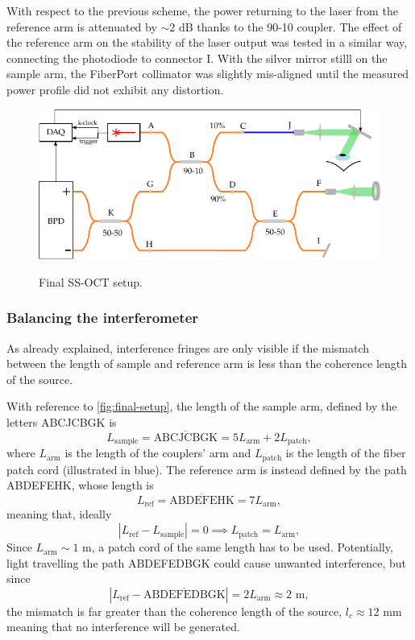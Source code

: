 With respect to the previous scheme, the power returning to the laser from the reference arm is attenuated by $\sim 2$ dB thanks to the 90-10 coupler. 
The effect of the reference arm on the stability of the laser output was tested in a similar way, connecting the photodiode to connector I. With the silver mirror stilll on the sample arm, the FiberPort collimator was slightly mis-aligned until the measured power profile did not exhibit any distortion. 

\begin{figure}[bth]
	\myfloatalign
	{\includegraphics[width=\linewidth]{gfx/setup-diagrams/final-setup-2.pdf}}
	\caption{Final SS-OCT setup.}\label{fig:final-setup}
\end{figure}

\subsubsection{Balancing the interferometer}
As already explained, interference fringes are only visible if the mismatch between the length of sample and reference arm is less than the coherence length of the source.

With reference to \autoref{fig:final-setup}, the length of the sample arm, defined by the letters ABCJCBGK is
\begin{equation}
L_{\text{sample}} = \overline{\text{ABCJCBGK}} = 5L_{\text{arm}} + 2L_{\text{patch}},
\end{equation}
where $L_{\text{arm}}$ is the length of the couplers' arm and $L_{\text{patch}}$ is the length of the fiber patch cord (illustrated in blue). The reference arm is instead defined by the path ABDEFEHK, whose length is
\begin{equation}
	L_{\text{ref}} = \overline{\text{ABDEFEHK}} = 7L_{\text{arm}},
\end{equation}
meaning that, ideally
\begin{equation}
	| L_{\text{ref}} - L_{\text{sample}}| = 0 \implies L_{\text{patch}} = L_{\text{arm}},
\end{equation}
Since $L_{\text{arm}} \sim 1$ m, a patch cord of the same length has to be used. Potentially, light travelling the path ABDEFEDBGK could cause unwanted interference, but since
\begin{equation}
| L_{\text{ref}} - \overline{\text{ABDEFEDBGK}}| = 2L_{\text{arm}} \approx 2 \text{ m},
\end{equation}
the mismatch is far greater than the coherence length of the source, $l_c \approx 12$ mm meaning that no interference will be generated. 

